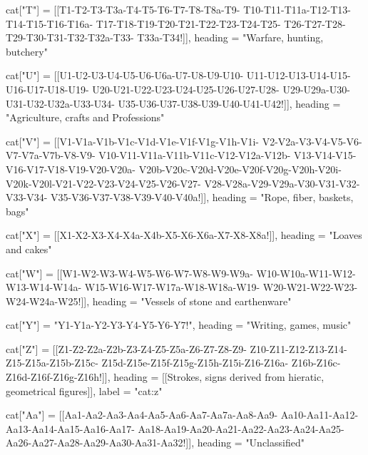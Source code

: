 \documentclass{article}
\begin{document}
\begin{luacode*}
cat["T"]   =   {[[T1-T2-T3-T3a-T4-T5-T6-T7-T8-T8a-T9-
                 T10-T11-T11a-T12-T13-T14-T15-T16-T16a-
                 T17-T18-T19-T20-T21-T22-T23-T24-T25-
                 T26-T27-T28-T29-T30-T31-T32-T32a-T33-
                 T33a-T34!]],
heading    =     "Warfare, hunting, butchery"}

cat["U"]   =    {[[U1-U2-U3-U4-U5-U6-U6a-U7-U8-U9-U10-
                  U11-U12-U13-U14-U15-U16-U17-U18-U19-
                  U20-U21-U22-U23-U24-U25-U26-U27-U28-
                  U29-U29a-U30-U31-U32-U32a-U33-U34-
                  U35-U36-U37-U38-U39-U40-U41-U42!]], 
                  heading = "Agriculture, crafts and Professions"}


cat["V"]   =    {[[V1-V1a-V1b-V1c-V1d-V1e-V1f-V1g-V1h-V1i-
                  V2-V2a-V3-V4-V5-V6-V7-V7a-V7b-V8-V9-
                  V10-V11-V11a-V11b-V11c-V12-V12a-V12b-
                  V13-V14-V15-V16-V17-V18-V19-V20-V20a-
                  V20b-V20c-V20d-V20e-V20f-V20g-V20h-V20i-
                  V20k-V20l-V21-V22-V23-V24-V25-V26-V27-
                  V28-V28a-V29-V29a-V30-V31-V32-V33-V34-
                  V35-V36-V37-V38-V39-V40-V40a!]], 
                  heading = "Rope, fiber, baskets, bags"}

cat["X"]   =    {[[X1-X2-X3-X4-X4a-X4b-X5-X6-X6a-X7-X8-X8a!]],
                   heading = "Loaves and cakes"}


cat["W"]   =     {[[W1-W2-W3-W4-W5-W6-W7-W8-W9-W9a-
                    W10-W10a-W11-W12-W13-W14-W14a-
                    W15-W16-W17-W17a-W18-W18a-W19-
                    W20-W21-W22-W23-W24-W24a-W25!]],
                    heading = "Vessels of stone and earthenware"}

cat["Y"]   =     {"Y1-Y1a-Y2-Y3-Y4-Y5-Y6-Y7!",
                   heading = "Writing, games, music"}

cat["Z"]   =     {[[Z1-Z2-Z2a-Z2b-Z3-Z4-Z5-Z5a-Z6-Z7-Z8-Z9-
                    Z10-Z11-Z12-Z13-Z14-Z15-Z15a-Z15b-Z15c-
                    Z15d-Z15e-Z15f-Z15g-Z15h-Z15i-Z16-Z16a-
                    Z16b-Z16c-Z16d-Z16f-Z16g-Z16h!]],
                    heading = [[Strokes, signs derived from 
                           hieratic, geometrical figures]],
                    label = "cat:z"}
 

cat["Aa"]  =     {[[Aa1-Aa2-Aa3-Aa4-Aa5-Aa6-Aa7-Aa7a-Aa8-Aa9-
						Aa10-Aa11-Aa12-Aa13-Aa14-Aa15-Aa16-Aa17-
						Aa18-Aa19-Aa20-Aa21-Aa22-Aa23-Aa24-Aa25-
						Aa26-Aa27-Aa28-Aa29-Aa30-Aa31-Aa32!]],
                   heading = "Unclassified"}


\end{luacode*}
\end{document}
